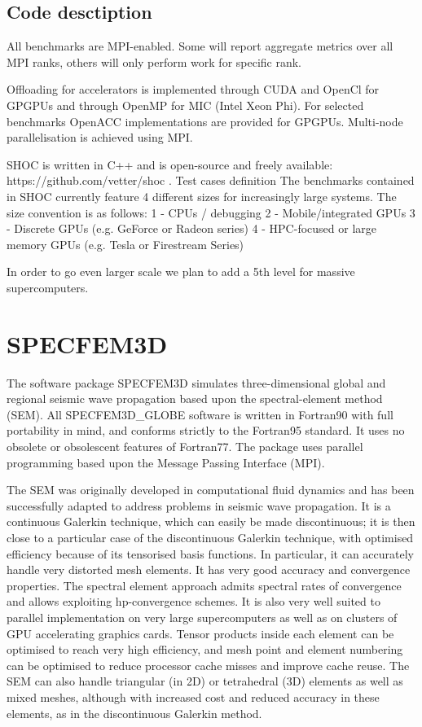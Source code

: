 \subsection{Code desctiption}

All benchmarks are MPI-enabled. Some will report aggregate metrics over all MPI ranks, others will only perform work for specific rank.

Offloading for accelerators is implemented through CUDA and OpenCl for GPGPUs and through OpenMP for MIC (Intel Xeon Phi). For selected benchmarks OpenACC implementations are provided for GPGPUs. Multi-node parallelisation is achieved using MPI.

SHOC is written in C++ and is open-source and freely available: https://github.com/vetter/shoc .
Test cases definition
The benchmarks contained in SHOC currently feature 4 different sizes for increasingly large systems. The size convention is as follows:
1 - CPUs / debugging
2 - Mobile/integrated GPUs
3 - Discrete GPUs (e.g. GeForce or Radeon series)
4 - HPC-focused or large memory GPUs (e.g. Tesla or Firestream Series)

In order to go even larger scale we plan to add a 5th level for massive supercomputers.

\section{SPECFEM3D}
The software package SPECFEM3D simulates three-dimensional global and regional seismic wave propagation based upon the spectral-element method (SEM). All SPECFEM3D\_GLOBE software is written in Fortran90 with full portability in mind, and conforms strictly to the Fortran95 standard. It uses no obsolete or obsolescent features of Fortran77. The package uses parallel programming based upon the Message Passing Interface (MPI).

The SEM was originally developed in computational fluid dynamics and has been successfully adapted to address problems in seismic wave propagation. It is a continuous Galerkin technique, which can easily be made discontinuous; it is then close to a particular case of the discontinuous Galerkin technique, with optimised efficiency because of its tensorised basis functions. In particular, it can accurately handle very distorted mesh elements. It has very good accuracy and convergence properties. The spectral element approach admits spectral rates of convergence and allows exploiting hp-convergence schemes. It is also very well suited to parallel implementation on very large supercomputers as well as on clusters of GPU accelerating graphics cards. Tensor products inside each element can be optimised to reach very high efficiency, and mesh point and element numbering can be optimised to reduce processor cache misses and improve cache reuse. The SEM can also handle triangular (in 2D) or tetrahedral (3D) elements as well as mixed meshes, although with increased cost and reduced accuracy in these elements, as in the discontinuous Galerkin method.

